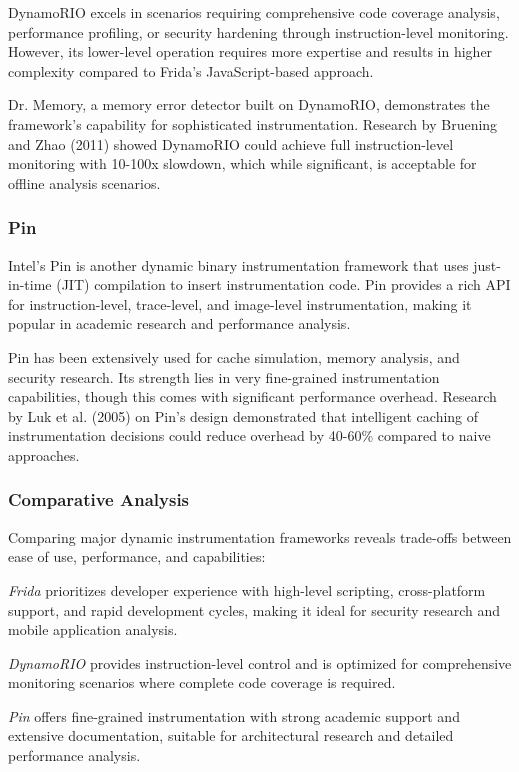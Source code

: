 DynamoRIO excels in scenarios requiring comprehensive code coverage analysis, performance profiling, or security hardening through instruction-level monitoring. However, its lower-level operation requires more expertise and results in higher complexity compared to Frida's JavaScript-based approach.

Dr. Memory, a memory error detector built on DynamoRIO, demonstrates the framework's capability for sophisticated instrumentation. Research by Bruening and Zhao (2011) showed DynamoRIO could achieve full instruction-level monitoring with 10-100x slowdown, which while significant, is acceptable for offline analysis scenarios.

\subsubsection{Pin}
Intel's Pin is another dynamic binary instrumentation framework that uses just-in-time (JIT) compilation to insert instrumentation code. Pin provides a rich API for instruction-level, trace-level, and image-level instrumentation, making it popular in academic research and performance analysis.

Pin has been extensively used for cache simulation, memory analysis, and security research. Its strength lies in very fine-grained instrumentation capabilities, though this comes with significant performance overhead. Research by Luk et al. (2005) on Pin's design demonstrated that intelligent caching of instrumentation decisions could reduce overhead by 40-60\% compared to naive approaches.

\subsubsection{Comparative Analysis}
Comparing major dynamic instrumentation frameworks reveals trade-offs between ease of use, performance, and capabilities:

\textit{Frida} prioritizes developer experience with high-level scripting, cross-platform support, and rapid development cycles, making it ideal for security research and mobile application analysis.

\textit{DynamoRIO} provides instruction-level control and is optimized for comprehensive monitoring scenarios where complete code coverage is required.

\textit{Pin} offers fine-grained instrumentation with strong academic support and extensive documentation, suitable for architectural research and detailed performance analysis.

